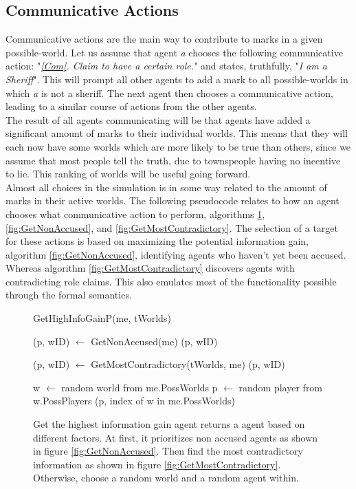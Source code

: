 \subsection{Communicative Actions}\label{CommunicativeActions}
Communicative actions are the main way to contribute to marks in a given
possible-world. Let us assume that agent \textit{a} chooses the following
communicative action: "\textit{\ref{Com}. Claim to have a certain role.}" and
states, truthfully, "\textit{I am a Sheriff}". This will prompt all other
agents to add a mark to all possible-worlds in which \textit{a} is not a
sheriff. The next agent then chooses a communicative action, leading to a
similar course of actions from the other agents. \\ The result of all agents
communicating will be that agents have added a significant amount of marks to
their individual worlds. This means that they will each now have some worlds
which are more likely to be true than others, since we assume that most people
tell the truth, due to townspeople having no incentive to lie. This ranking of
worlds will be useful going forward.\\ Almost all choices in the simulation is
in some way related to the amount of marks in their active worlds. The
following pseudocode relates to how an agent chooses what communicative action
to perform, algorithms \ref{fig:GetHighInfoGainP}, \ref{fig:GetNonAccused}, and
\ref{fig:GetMostContradictory}. The selection of a target for these actions is
based on maximizing the potential information gain, algorithm
\ref{fig:GetNonAccused}, identifying agents who haven't yet been accused.
Whereas algorithm \ref{fig:GetMostContradictory} discovers agents with
contradicting role claims. This also emulates most of the functionality possible through the formal semantics.\\
\begin{figure}[H]
	\begin{algorithm}[H]
		\caption{GetHighInfoGainP(me, tWorlds)}
		\begin{algorithmic}
			\State (p, wID) $\gets$ GetNonAccused(me)
			\State \Return (p, wID)
			\EndIf
			\EndIf

			\State (p, wID) $\gets$ GetMostContradictory(tWorlds, me)
			\State \Return (p, wID)
			\EndIf

			\State w $\gets$ random world from me.PossWorlds
			\State p $\gets$ random player from w.PossPlayers
			\State \Return (p, index of w in me.PossWorlds)
		\end{algorithmic}
	\end{algorithm}
	\caption{Get the highest information gain agent returns a agent based on different factors.
		At first, it prioritizes non accused agents as shown in figure \ref{fig:GetNonAccused}.
		Then find the most contradictory information as shown in figure \ref{fig:GetMostContradictory}.
		Otherwise, choose a random world and a random agent within.
	}
	\label{fig:GetHighInfoGainP}
\end{figure}
